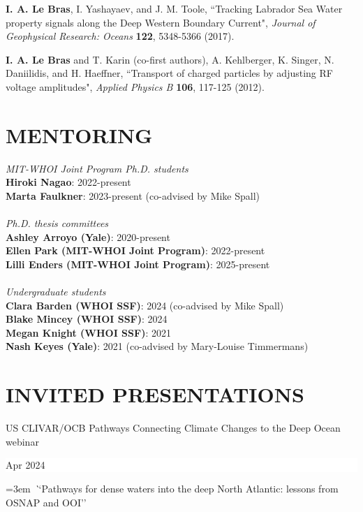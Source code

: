 \documentclass[paper=letter,fontsize=11pt]{scrartcl} %
\newcommand{\sepspace}{\vspace*{3mm}}		%
\newcommand{\NewPart}[2]{\section*{\uppercase{#1} #2}}
\newcommand{\ShortEntry}[2]{\normalsize \noindent \textbf{#1}: #2 \\ }
\newcommand{\PaperEntry}[6]{
		\noindent #1, ``#2", \textit{#3} \textbf{#4}, #5 (#6).}
\newcommand{\TalkEntry}[3]{
		\noindent #1 \hfill      %
		\colorbox{White}{%
			\parbox{6em}{%
			\hfill\color{Black}#2}} \par  %
		\noindent\hangindent=3em\hangafter=0 \textit ``#3''\sepspace} %
\begin{document}
\begin{etaremune}
\item \PaperEntry{\textbf{I. A. Le Bras}, I. Yashayaev, and J. M. Toole}{Tracking Labrador Sea Water property signals along the Deep Western Boundary Current}{ Journal of Geophysical Research: Oceans}{122}{5348-5366}{2017}

\item \PaperEntry{\textbf{I. A. Le Bras} and T. Karin (co-first authors), A. Kehlberger, K. Singer, N. Daniilidis, and H. Haeffner}{Transport of charged particles by adjusting RF voltage amplitudes}{Applied Physics B}{106}{117-125}{2012}

\end{etaremune}



\NewPart{Mentoring}{}


\emph{MIT-WHOI Joint Program Ph.D. students}\\
\ShortEntry{Hiroki Nagao}{2022-present}
\ShortEntry{Marta Faulkner}{2023-present (co-advised by Mike Spall)}\\
\emph{Ph.D. thesis committees}\\
\ShortEntry{Ashley Arroyo (Yale)}{2020-present}
\ShortEntry{Ellen Park (MIT-WHOI Joint Program)}{2022-present}
\ShortEntry{Lilli Enders (MIT-WHOI Joint Program)}{2025-present}\\
\emph{Undergraduate students}\\
\ShortEntry{Clara Barden (WHOI SSF)}{2024 (co-advised by Mike Spall)}
\ShortEntry{Blake Mincey (WHOI SSF)}{2024}
\ShortEntry{Megan Knight (WHOI SSF)}{2021}
\ShortEntry{Nash Keyes (Yale)}{2021  (co-advised by Mary-Louise Timmermans)}

\NewPart{Invited presentations}{}

\TalkEntry{US CLIVAR/OCB Pathways Connecting Climate Changes to the Deep Ocean webinar}{Apr 2024}{Pathways for dense waters into the deep North Atlantic: lessons from OSNAP and OOI}
\end{document}
